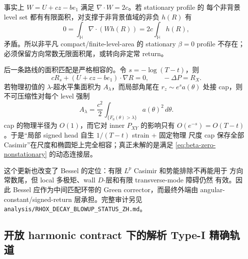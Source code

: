 \documentclass[11pt,a4paper,fontset=fandol]{ctexart}
\begin{document}
事实上 $W=U+cz-be_1$ 满足 $\nabla\cdot W=2c$。若 stationary profile 的
每个非背景 level set 都有有限面积，对支撑于非背景值域的非负 $h(R)$ 有
\begin{equation}
 0=\int_{\mathbb H}\nabla\cdot(Wh(R))
 =2c\int_{\mathbb H}h(R),
 \label{eq:beta-zero-compact-nogo}
\end{equation}
矛盾。所以非平凡 compact/finite-level-area 的 stationary $\beta=0$ profile
不存在；必须保留方向常数无限面积尾，或转向非定常 return。

后一条路线的面积匹配是严格相容的。令 $s=-\log(T-t)$，则
\begin{equation}
 cR_s+(U+cz-be_1)\cdot\nabla R=0,
 \qquad -\Delta P=R_X.
 \label{eq:beta-zero-nonstationary}
\end{equation}
若物理初值的 $\lambda$-超水平集面积为 $A_\lambda$，而局部角尾在
$r_z\sim e^sa(\theta)$ 处接 cap，则不可压缩性对每个 level 强制
\begin{equation}
 \boxed{A_\lambda=\frac{c^2}{2}
 \int_{\{F_0(\theta)>\lambda\}}a(\theta)^2\,d\theta.}
 \label{eq:beta-zero-area-law}
\end{equation}
cap 的物理半径为 $O(1)$，而它对 inner $P_{XY}$ 的影响只有
$O(e^{-s})=O(T-t)$。于是“局部 signed head 自生 $1/(T-t)$ strain + 固定物理
尺度 cap 保存全部 Casimir”在尺度和椭圆矩上完全相容；真正未解的是满足
\eqref{eq:beta-zero-nonstationary} 的动态连接层。

这个更新也改变了 Bessel 的定位：有限 $L^p$ Casimir 和势能排除不再能用于
方向常数尾，但 local 多极矩、wall $D$-层和有限 transverse-mode 障碍仍然
有效。因此 Bessel 应作为中间匹配环带的 Green corrector，而最终外端由
angular-constant/signed-return 层承担。完整审计另见
\texttt{analysis/RHOX\_DECAY\_BLOWUP\_STATUS\_ZH.md}。

\subsection{开放 harmonic contract 下的解析 Type-I 精确轨道}
\end{document}
